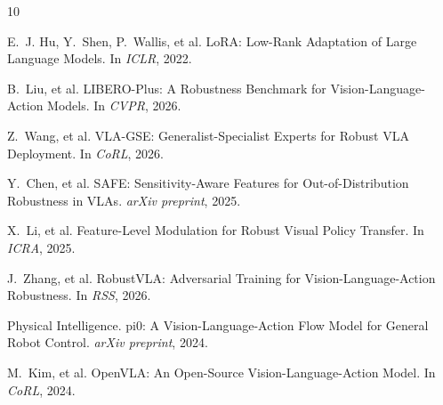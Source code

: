 \documentclass[conference]{article}
\begin{document}

\begin{thebibliography}{10}

E.~J. Hu, Y.~Shen, P.~Wallis, et al.
\newblock LoRA: Low-Rank Adaptation of Large Language Models.
\newblock In \emph{ICLR}, 2022.

B.~Liu, et al.
\newblock LIBERO-Plus: A Robustness Benchmark for Vision-Language-Action Models.
\newblock In \emph{CVPR}, 2026.

Z.~Wang, et al.
\newblock VLA-GSE: Generalist-Specialist Experts for Robust VLA Deployment.
\newblock In \emph{CoRL}, 2026.

Y.~Chen, et al.
\newblock SAFE: Sensitivity-Aware Features for Out-of-Distribution Robustness in VLAs.
\newblock \emph{arXiv preprint}, 2025.

X.~Li, et al.
\newblock Feature-Level Modulation for Robust Visual Policy Transfer.
\newblock In \emph{ICRA}, 2025.

J.~Zhang, et al.
\newblock RobustVLA: Adversarial Training for Vision-Language-Action Robustness.
\newblock In \emph{RSS}, 2026.

Physical Intelligence.
\newblock pi0: A Vision-Language-Action Flow Model for General Robot Control.
\newblock \emph{arXiv preprint}, 2024.

M.~Kim, et al.
\newblock OpenVLA: An Open-Source Vision-Language-Action Model.
\newblock In \emph{CoRL}, 2024.

\end{thebibliography}
\end{document}
